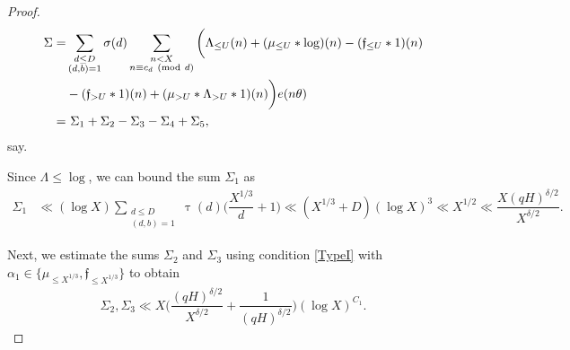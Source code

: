 \documentclass[12pt]{amsart}
\numberwithin{equation}{section}
\theoremstyle{remark}
\theoremstyle{definition}
\newcommand{\imod}[1]{\ (\mathrm{mod}\ #1)}
\begin{document}
\begin{proof}
\begin{align}
\notag \Sigma =& \sum_{\substack{d\leq D\\(d, b)=1}}\sigma(d)\sum_{\substack{n<X\\n\equiv c_d\imod d}}\bigg(\Lambda_{\leq U}(n) + (\mu_{\leq U}*\log)(n) - (\mathfrak{f}_{\leq U}*1)(n)\\
\notag & - (\mathfrak{f}_{> U}*1)(n)+ (\mu_{>U}*\Lambda_{>U}*1)(n)\bigg)e(n\theta)\\
\label{Gen Sigma i} =&~\Sigma_1 + \Sigma_2 - \Sigma_3 - \Sigma_4 + \Sigma_5,
\end{align}
say.

Since $\Lambda \leq \log$, we can bound the sum $\Sigma_1$ as
\begin{align}\label{Gen Sigma ii}
\Sigma_1 
 &\ll (\log X)\sum_{\substack{d\leq D\\(d, b)=1}}\uptau(d)\bigg(\dfrac{X^{1/3}}{d} + 1\bigg)\ll (X^{1/3} + D)(\log X)^3 \ll X^{1/2} \ll \dfrac{X (qH)^{\delta/2}}{X^{\delta/2}}.
\end{align}

Next, we estimate the sums $\Sigma_2$ and $\Sigma_3$ using condition \ref{TypeI} with $\alpha_1\in \{\mu_{\leq X^{1/3}}, \mathfrak{f}_{\leq X^{1/3}}\}$ to obtain
\begin{align}\label{Gen Sigma iii}
\Sigma_2, \Sigma_3 \ll X\bigg(\dfrac{(qH)^{\delta/2}}{X^{\delta/2}} + \dfrac{1}{(qH)^{\delta/2}}\bigg)(\log X)^{C_1}.
\end{align}



\end{proof}
\end{document}
